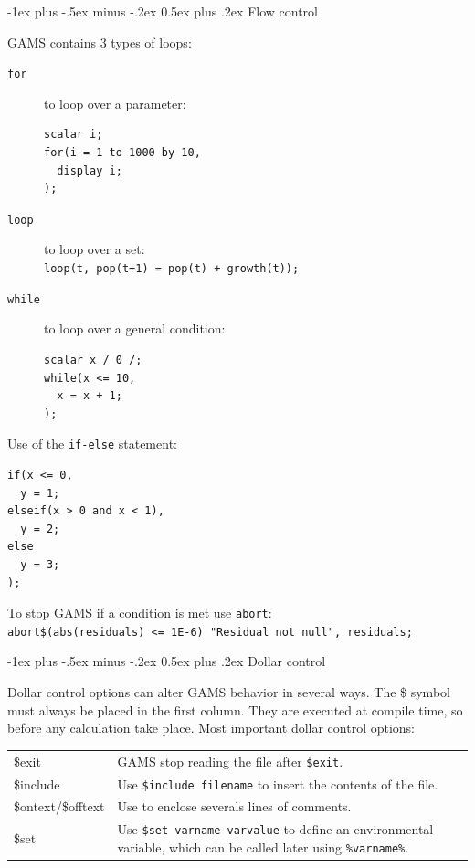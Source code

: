 \documentclass[10pt,landscape,a4paper]{article}
\makeatletter
\renewcommand{\section}{\@startsection{section}{1}{0mm}%
                                {-1ex plus -.5ex minus -.2ex}%
                                {0.5ex plus .2ex}%
                                {\color{blue}\normalfont\large\bfseries}}
\makeatother
\begin{document}
\begin{multicols}{2}
\section{Flow control}

GAMS contains 3 types of loops:
\begin{description}
\item[\texttt{for}] to loop over a parameter:\\
\begin{verbatim}
scalar i;
for(i = 1 to 1000 by 10,
  display i;
);
\end{verbatim}
\item[\texttt{loop}] to loop over a set:\\
  \verb!loop(t, pop(t+1) = pop(t) + growth(t));!
\item[\texttt{while}] to loop over a general condition:\\
\begin{verbatim}
scalar x / 0 /;
while(x <= 10,
  x = x + 1;
);
\end{verbatim}
\end{description}

Use of the \verb!if-else! statement:\\
\begin{verbatim}
if(x <= 0,
  y = 1;
elseif(x > 0 and x < 1),
  y = 2;
else
  y = 3;
);
\end{verbatim}

To stop GAMS if a condition is met use \verb!abort!:\\
\verb!abort$(abs(residuals) <= 1E-6) "Residual not null", residuals;!

\section{Dollar control}

Dollar control options can alter GAMS behavior in several ways. The \$ symbol
must always be placed in the first column. They are executed at compile time, so
before any calculation take place. Most important dollar control options:
\begin{tabularx}{\columnwidth}{@{}>{\ttfamily}lX@{}}
\$exit & GAMS stop reading the file after \texttt{\$exit}.\\
\$include & Use \texttt{\$include filename} to insert the contents of the
file.\\
\$ontext\textrm{/}\$offtext & Use to enclose severals lines of comments.\\
\$set & Use \texttt{\$set varname varvalue} to define an environmental
variable, which can be called later using \texttt{\%varname\%}.
\end{tabularx}


\end{multicols}
\end{document}
